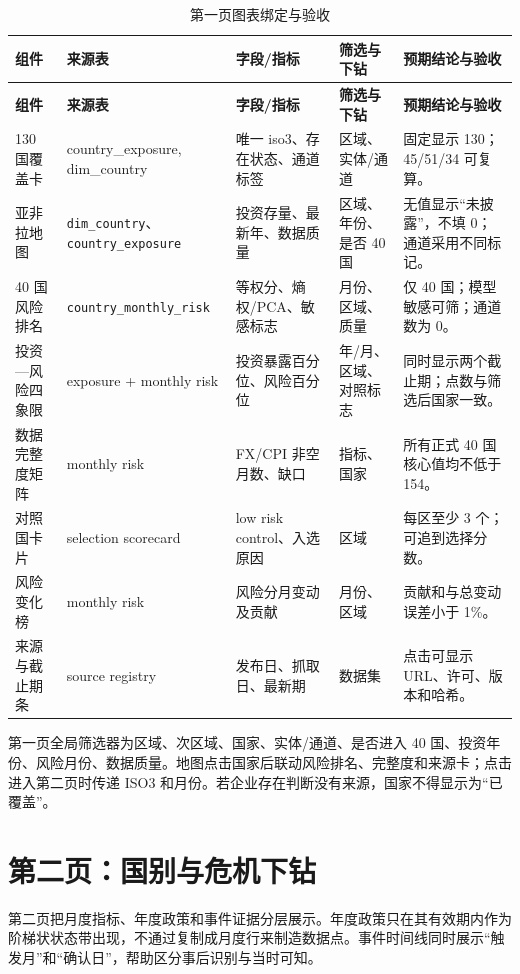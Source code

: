 \documentclass[UTF8,fontset=windows,12pt,openany]{ctexbook}
\newcommand{\Field}[1]{{\small\nolinkurl{#1}}}
\begin{document}
\clearpage
\begin{landscape}
\begin{longtable}{p{3.3cm}p{3.4cm}p{4.3cm}p{3.2cm}p{4.7cm}}
\caption{第一页图表绑定与验收}\label{tab:page1-map}\\
\toprule
\textbf{组件} & \textbf{来源表} & \textbf{字段/指标} & \textbf{筛选与下钻} & \textbf{预期结论与验收}\\
\midrule
\endfirsthead
\toprule \textbf{组件} & \textbf{来源表} & \textbf{字段/指标} & \textbf{筛选与下钻} & \textbf{预期结论与验收}\\ \midrule
\endhead
130 国覆盖卡 & country\_exposure, dim\_country & 唯一 iso3、存在状态、通道标签 & 区域、实体/通道 & 固定显示 130；45/51/34 可复算。\\
亚非拉地图 & \Field{dim_country}、\Field{country_exposure} & 投资存量、最新年、数据质量 & 区域、年份、是否 40 国 & 无值显示“未披露”，不填 0；通道采用不同标记。\\
40 国风险排名 & \Field{country_monthly_risk} & 等权分、熵权/PCA、敏感标志 & 月份、区域、质量 & 仅 40 国；模型敏感可筛；通道数为 0。\\
投资—风险四象限 & exposure + monthly risk & 投资暴露百分位、风险百分位 & 年/月、区域、对照标志 & 同时显示两个截止期；点数与筛选后国家一致。\\
数据完整度矩阵 & monthly risk & FX/CPI 非空月数、缺口 & 指标、国家 & 所有正式 40 国核心值均不低于 154。\\
对照国卡片 & selection scorecard & low risk control、入选原因 & 区域 & 每区至少 3 个；可追到选择分数。\\
风险变化榜 & monthly risk & 风险分月变动及贡献 & 月份、区域 & 贡献和与总变动误差小于 1\%。\\
来源与截止期条 & source registry & 发布日、抓取日、最新期 & 数据集 & 点击可显示 URL、许可、版本和哈希。\\
\bottomrule
\end{longtable}
\end{landscape}

第一页全局筛选器为区域、次区域、国家、实体/通道、是否进入 40 国、投资年份、风险月份、数据质量。地图点击国家后联动风险排名、完整度和来源卡；点击进入第二页时传递 ISO3 和月份。若企业存在判断没有来源，国家不得显示为“已覆盖”。

\chapter{第二页：国别与危机下钻}

第二页把月度指标、年度政策和事件证据分层展示。年度政策只在其有效期内作为阶梯状状态带出现，不通过复制成月度行来制造数据点。事件时间线同时展示“触发月”和“确认日”，帮助区分事后识别与当时可知。
\end{document}
